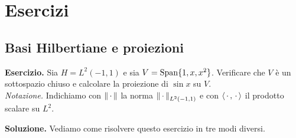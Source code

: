 %
%

\section{Esercizi}

\subsection{Basi Hilbertiane e proiezioni}

\textbf{Esercizio.}
Sia $H = L^2(-1, 1)$ e sia $V = \operatorname{Span}\{ 1, x, x^2 \}$. Verificare che $V$ è un sottospazio chiuso e calcolare la proiezione di $\sin x$ su $V$. \\
\textit{Notazione.} Indichiamo con $\left\lVert \,\cdot\, \right\rVert$ la norma $\left\lVert \,\cdot\, \right\rVert_{L^2(-1, 1)}$ e con $\langle \,\cdot\,, \,\cdot\, \rangle$ il prodotto scalare su $L^2$.

\textbf{Soluzione.}
Vediamo come risolvere questo esercizio in tre modi diversi.

